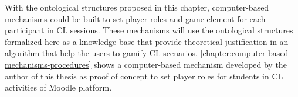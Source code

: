 With the ontological structures proposed in this chapter, computer-based mechanisms could be built to set player roles and game element for each participant in CL sessions. These mechanisms will use the ontological structures formalized here as a knowledge-base that provide theoretical justification in an algorithm that help the users to gamify CL scenarios. \autoref{chapter:computer-based-mechanisms-procedures} shows a computer-based mechanism developed by the author of this thesis as proof of concept to set player roles for students in CL activities of Moodle platform.


